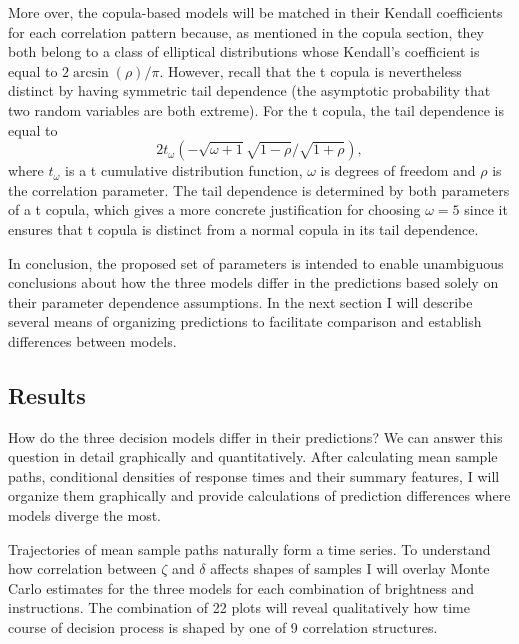 \documentclass[12pt]{report}
\begin{document}
More over, the copula-based models will be matched in their Kendall coefficients for each correlation pattern because, as mentioned in the copula section, they both belong to a class of elliptical distributions whose Kendall's coefficient is equal to $2\arcsin(\rho)/\pi$. However, recall that the t copula is nevertheless distinct by having symmetric tail dependence (the asymptotic probability that two random variables are both extreme). For the t copula, the tail dependence is equal to
\begin{equation}
\label{tail_dep}
2t_{\omega}(-\sqrt{\omega + 1}\sqrt{1 - \rho}/\sqrt{1 + \rho}),
\end{equation}
where $t_{\omega}$ is a t cumulative distribution function, $\omega$ is degrees of freedom and $\rho$ is the correlation parameter. The tail dependence is determined by both parameters of a t copula, which gives a more concrete justification for choosing $\omega = 5$ since it ensures that t copula is distinct from a normal copula in its tail dependence. 

In conclusion, the proposed set of parameters is intended to enable unambiguous conclusions about how the three models differ in the predictions based solely on their parameter dependence assumptions. In the next section I will describe several means of organizing predictions to facilitate comparison and establish differences between models.

\subsection{Results}

How do the three decision models differ in their predictions? We can answer this question in detail graphically and quantitatively. After calculating mean sample paths, conditional densities of response times and their summary features, I will organize them graphically and provide calculations of prediction differences where models diverge the most. 

Trajectories of mean sample paths naturally form a time series. To understand how correlation between $\zeta$ and $\delta$ affects shapes of samples I will overlay Monte Carlo estimates for the three models for each combination of brightness and instructions. The combination of 22 plots will reveal qualitatively how time course of decision process is shaped by one of 9 correlation structures.
\end{document}
